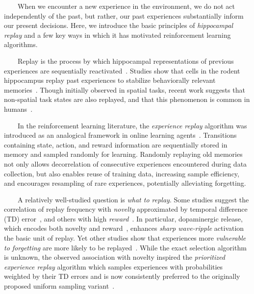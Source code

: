 
\begin{center}
  \begin{tcolorbox}[breakable,sharp corners=all,coltitle=black,colbacktitle=white,
    width=\textwidth,boxsep=5pt,left=5pt,right=5pt,
    title={\textbf{Box B: Replaying Experience, Consolidating Memory}}]

    
~~~~When we encounter a new experience in the environment, we do not act independently of the past, but rather, our past experiences substantially inform our present decisions. Here, we introduce the basic principles of \textit{hippocampal replay} and a few key ways in which it has motivated reinforcement learning algorithms.

~~~~Replay is the process by which hippocampal representations of previous experiences are sequentially reactivated~\cite{CarretalNATURE-NEUROSCIENCE-11}. Studies show that cells in the rodent hippocampus replay past experiences to stabilize behaviorally relevant memories~\cite{OlafsdottirCURRENT-BIOLOGY-18,JooandFrankNATURE-REVIEWS-NEUROSCIENCE-18}. Though initially observed in spatial tasks, recent work suggests that non-spatial task states are also replayed, and that this phenomenon is common in humans~\cite{SchuckandNivDOI-18}. 

~~~~In the reinforcement learning literature, the \textit{experience replay} algorithm was introduced as an analogical framework in online learning agents~\cite{LinML-92}. Transitions containing state, action, and reward information are sequentially stored in memory and sampled randomly for learning. Randomly replaying old memories not only allows decorrelation of consecutive experiences encountered during data collection, but also enables reuse of training data, increasing sample efficiency, and encourages resampling of rare experiences, potentially alleviating forgetting. 

~~~~A relatively well-studied question is \textit{what to replay}. Some studies suggest the correlation of replay frequency with \textit{novelty} approximated by temporal difference (TD) error~\cite{FosterandWilsonNATURE-06}, and others with high \textit{reward}~\cite{OlafsdottirCURRENT-BIOLOGY-18}. In particular, dopaminergic release, which encodes both novelty and reward~\cite{MenegasetalELIFE-17}, enhances {\textit{sharp wave-ripple}} activation \emdash{} the basic unit of replay. Yet other studies show that experiences more \textit{vulnerable to forgetting} are more likely to be replayed~\cite{SchapiroetalNATURE-COMMUNICATIONS-18}. While the exact selection algorithm is unknown, the observed association with novelty inspired the \textit{prioritized experience replay} algorithm which samples experiences with probabilities weighted by their TD errors and is now consistently preferred to the originally proposed uniform sampling variant~\cite{SchauletalCoRR-15}. 


\end{tcolorbox}
\end{center}
